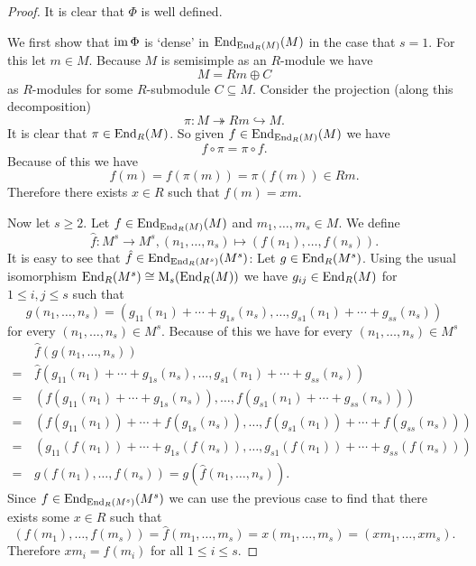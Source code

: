 \begin{proof}
  It is clear that $\Phi$ is well defined.
  
  We first show that $\operatorname{im} \Phi$ is `dense' in $\operatorname{End}_{\operatorname{End}_R(M)}(M)$ in the case that $s = 1$.
  For this let $m \in M$. Because $M$ is semisimple as an $R$-module we have
  \[
    M = Rm \oplus C
  \]
  as $R$-modules for some $R$-submodule $C \subseteq M$.
  Consider the projection (along this decomposition)
  \[
                        \pi
    \colon              M
    \twoheadrightarrow  Rm
    \hookrightarrow     M.
  \]
  It is clear that $\pi \in \operatorname{End}_R(M)$.
  So given $f \in \operatorname{End}_{\operatorname{End}_R(M)}(M)$ we have
  \[
      f \circ \pi
    = \pi \circ f.
  \]
  Because of this we have
  \[
        f(m)
    =   f(\pi(m))
    =   \pi(f(m))
    \in Rm.
  \]
  Therefore there exists $x \in R$ such that $f(m) = xm$.

  Now let $s \geq 2$. Let $f \in \operatorname{End}_{\operatorname{End}_R(M)}(M)$ and $m_1, \dotsc, m_s \in M$.
  We define
  \[
            \hat{f}
    \colon  M^s
    \to     M^s,
            (n_1, \dotsc, n_s)
    \mapsto (f(n_1), \dotsc, f(n_s)).
  \]
  It is easy to see that $\hat{f} \in \operatorname{End}_{\operatorname{End}_R(M^s)}(M^s)$:
  Let $g \in \operatorname{End}_R(M^s)$.
  Using the usual isomorphism $\operatorname{End}_R(M^s) \cong \operatorname{M}_s(\operatorname{End}_R(M))$ we have $g_{ij} \in \operatorname{End}_R(M)$ for $1 \leq i,j \leq s$ such that
  \[
      g(n_1, \dotsc, n_s)
    = ( g_{11}(n_1) + \dotsb + g_{1s}(n_s),
        \dotsc,
        g_{s1}(n_1) + \dotsb + g_{ss}(n_s)  )
  \]
  for every $(n_1, \dotsc, n_s) \in M^s$.
  Because of this we have for every $(n_1, \dotsc, n_s) \in M^s$
  \begin{align*}
     &\,  \hat{f}( g(n_1, \dotsc, n_s) )  \\
    =&\,  \hat{f}( g_{11}(n_1) + \dotsb + g_{1s}(n_s),
                   \dotsc,
                   g_{s1}(n_1) + \dotsb + g_{ss}(n_s) ) \\
    =&\,  ( f(g_{11}(n_1) + \dotsb + g_{1s}(n_s)),
            \dotsc,
            f(g_{s1}(n_1) + \dotsb + g_{ss}(n_s)) ) \\
    =&\,  ( f(g_{11}(n_1)) + \dotsb + f(g_{1s}(n_s)),
            \dotsc,
            f(g_{s1}(n_1)) + \dotsb + f(g_{ss}(n_s))  ) \\
    =&\,  ( g_{11}(f(n_1)) + \dotsb + g_{1s}(f(n_s)),
            \dotsc,
            g_{s1}(f(n_1)) + \dotsb + g_{ss}(f(n_s))  ) \\
    =&\,  g( f(n_1), \dotsc, f(n_s) )
    =     g( \hat{f}(n_1, \dotsc, n_s )).
  \end{align*}
  Since $f \in \operatorname{End}_{\operatorname{End}_R(M^s)}(M^s)$ we can use the previous case to find that there exists some $x \in R$ such that
  \[
    (f(m_1), \dotsc, f(m_s))
    = \hat{f}(m_1, \dotsc, m_s)
    = x (m_1, \dotsc, m_s)
    = (x m_1, \dotsc, x m_s).
  \]
  Therefore $x m_i = f(m_i)$ for all $1 \leq i \leq s$.
\end{proof}


